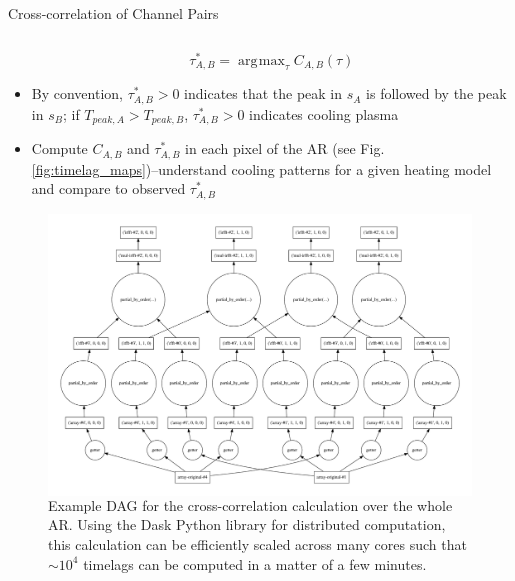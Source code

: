 \documentclass[final]{beamer}
\DeclareMathOperator*{\argmax}{\arg\!\max}
\begin{document}
\begin{frame}
\begin{columns}[T]
\begin{column}{0.49\linewidth}
\begin{block}{Cross-correlation of Channel Pairs}
\begin{columns}[c]
\begin{column}{0.49\columnwidth}
\begin{itemize}
                    \begin{equation}
                        \tau^*_{A,B} = \argmax_{\tau}C_{A,B}(\tau)
                    \end{equation}
                    \item By convention, $\tau^*_{A,B}>0$ indicates that the peak in $s_A$ is followed by the peak in $s_B$; if $T_{peak,A}>T_{peak,B}$, $\tau^*_{A,B}>0$ indicates \alert{cooling} plasma
                    \item Compute $C_{A,B}$ and $\tau^*_{A,B}$ in each pixel of the AR (see Fig. \ref{fig:timelag_maps})--understand cooling patterns for a given heating model and compare to observed $\tau^*_{A,B}$
                \end{itemize}
                \begin{figure}
                    \begin{columns}[c]
                        \includegraphics[width=\columnwidth]{figures/timelag_dag.pdf}
                        \caption{Example DAG for the cross-correlation calculation over the whole AR. Using the Dask Python library \citep{dask_development_team_dask:_2016} for distributed computation, this calculation can be efficiently scaled across many cores such that $\sim10^4$ timelags can be computed in a matter of a few minutes.}
                    \end{columns}
                    \label{fig:timelag_dask_dag}
                \end{figure}
            \end{column}
        \end{columns}

\end{block}
\end{column}
\end{columns}
\end{frame}
\end{document}
